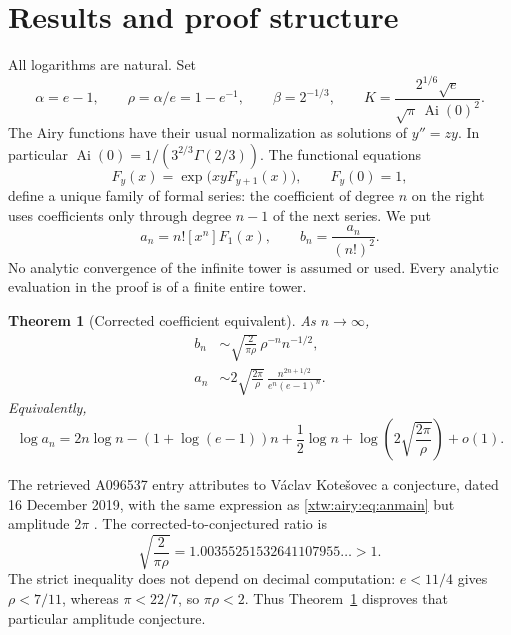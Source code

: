 \documentclass[11pt]{article}
\newtheorem{theorem}{Theorem}[section]
\theoremstyle{remark}\newtheorem{remark}[theorem]{Remark}
\newcommand{\Ai}{\operatorname{Ai}}
\begin{document}
\section{Results and proof structure}\label{xtw:airy:sec:results}
All logarithms are natural. Set
\begin{equation}\label{xtw:airy:eq:constants}
 \alpha=e-1,\qquad \rho=\alpha/e=1-e^{-1},\qquad
 \beta=2^{-1/3},\qquad
 K=\frac{2^{1/6}\sqrt e}{\sqrt\pi\,\Ai(0)^2}.
\end{equation}
The Airy functions have their usual normalization as solutions of $y''=zy$.
In particular $\Ai(0)=1/(3^{2/3}\Gamma(2/3))$.
The functional equations
\begin{equation}\label{xtw:airy:eq:shiftfamily}
 F_y(x)=\exp\bigl(xyF_{y+1}(x)\bigr),\qquad F_y(0)=1,
\end{equation}
define a unique family of formal series: the coefficient of degree $n$ on the
right uses coefficients only through degree $n-1$ of the next series. We put
\begin{equation}\label{xtw:airy:eq:anbn}
 a_n=n![x^n]F_1(x),\qquad b_n=\frac{a_n}{(n!)^2}.
\end{equation}
No analytic convergence of the infinite tower is assumed or used. Every
analytic evaluation in the proof is of a finite entire tower.

\begin{theorem}[Corrected coefficient equivalent]\label{xtw:airy:thm:main}
As $n\to\infty$,
\begin{align}
 b_n&\sim\sqrt{\frac{2}{\pi\rho}}\,\rho^{-n}n^{-1/2},\label{xtw:airy:eq:bnmain}\\
 a_n&\sim 2\sqrt{\frac{2\pi}{\rho}}\,
 \frac{n^{2n+1/2}}{e^n(e-1)^n}.\label{xtw:airy:eq:anmain}
\end{align}
Equivalently,
\begin{equation}\label{xtw:airy:eq:logmain}
 \log a_n=2n\log n-(1+\log(e-1))n
       +\frac12\log n+\log\!\left(2\sqrt{\frac{2\pi}{\rho}}\right)+o(1).
\end{equation}
\end{theorem}

The retrieved A096537 entry attributes to V\'aclav Kote\v{s}ovec a conjecture,
dated 16 December 2019, with the same expression as \eqref{xtw:airy:eq:anmain} but
amplitude $2\pi$ \cite{oeis537}. The corrected-to-conjectured ratio is
\begin{equation}\label{xtw:airy:eq:ratio}
 \sqrt{\frac{2}{\pi\rho}}=1.00355251532641107955\ldots>1.
\end{equation}
The strict inequality does not depend on decimal computation: $e<11/4$ gives
$\rho<7/11$, whereas $\pi<22/7$, so $\pi\rho<2$. Thus
Theorem~\ref{xtw:airy:thm:main} disproves that particular amplitude conjecture.
\end{document}
